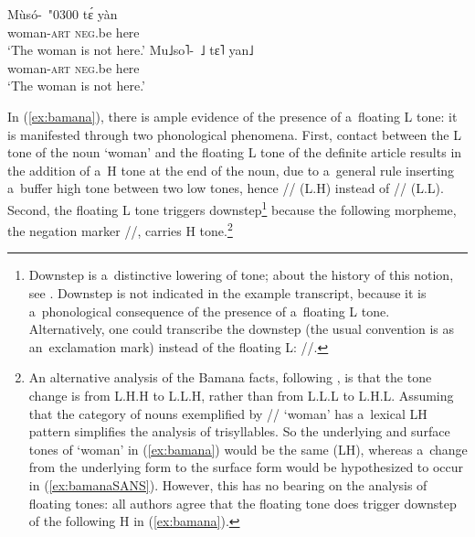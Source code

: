 \begin{exe}
  \ex
  \label{ex:bamana}
  \begin{xlist}
	\ex
	\label{ex:bamanaafr}
	\gll Mùsó-~{\kern2pt}\char"0300 tɛ́ yàn\\
	woman-\textsc{art} \textsc{neg}.be here\\
	\glt	‘The woman is not here.’
	\ex
	\label{ex:bamanachao}
	\gll Mu˩so˥-~{\kern2pt}˩ tɛ˥ yan˩\\
	woman-\textsc{art} \textsc{neg}.be here\\
	\glt	‘The woman is not here.’
  \end{xlist}	
\end{exe}

 
In (\ref{ex:bamana}), there is ample evidence of the presence of a~floating L tone: it is manifested through two phonological phenomena. First, contact between the L tone of the noun ‘woman’ and the floating L tone of the definite article results in the addition of a~H tone at the end of the noun, due to a~general rule inserting a~buffer high tone between two low tones, hence // (L.H) instead of // (L.L). Second, the floating L tone triggers downstep\footnote{Downstep is a~distinctive lowering of tone; about the history of this notion, see \citet{rialland1997}. Downstep is not indicated in the example transcript, because it is a~phonological consequence of the presence of a~floating L tone. Alternatively, one could transcribe the {downstep} (the usual convention is as an~exclamation mark) instead of the floating L: //.} because the following morpheme, the negation marker //, carries H tone.\footnote{An alternative analysis of the Bamana facts, following \citet[24-25]{dumestre1987}, is that the tone change is from L.H.H to L.L.H, rather than from L.L.L to L.H.L. Assuming that the category of nouns exemplified by // ‘woman’ has a~lexical LH pattern simplifies the analysis of trisyllables. So the underlying and surface tones of ‘woman’ in (\ref{ex:bamana}) would be the same (LH), whereas a~change from the underlying form to the surface form would be hypothesized to occur in (\ref{ex:bamanaSANS}). However, this has no bearing on the analysis of floating tones: all authors agree that the floating tone does trigger {downstep} of the following H in (\ref{ex:bamana}).} 

